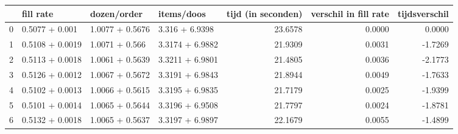 \begin{tabular}{llllrrr}
\toprule
{} &        fill rate &      dozen/order &       items/doos &  tijd (in seconden) &  verschil in fill rate &  tijdsverschil \\
\midrule
0 &   0.5077 + 0.001 &  1.0077 + 0.5676 &   3.316 + 6.9398 &             23.6578 &                 0.0000 &         0.0000 \\
1 &  0.5108 + 0.0019 &   1.0071 + 0.566 &  3.3174 + 6.9882 &             21.9309 &                 0.0031 &        -1.7269 \\
2 &  0.5113 + 0.0018 &  1.0061 + 0.5639 &  3.3211 + 6.9801 &             21.4805 &                 0.0036 &        -2.1773 \\
3 &  0.5126 + 0.0012 &  1.0067 + 0.5672 &  3.3191 + 6.9843 &             21.8944 &                 0.0049 &        -1.7633 \\
4 &  0.5102 + 0.0013 &  1.0066 + 0.5615 &  3.3195 + 6.9835 &             21.7179 &                 0.0025 &        -1.9399 \\
5 &  0.5101 + 0.0014 &  1.0065 + 0.5644 &  3.3196 + 6.9508 &             21.7797 &                 0.0024 &        -1.8781 \\
6 &  0.5132 + 0.0018 &  1.0065 + 0.5637 &  3.3197 + 6.9897 &             22.1679 &                 0.0055 &        -1.4899 \\
\bottomrule
\end{tabular}
